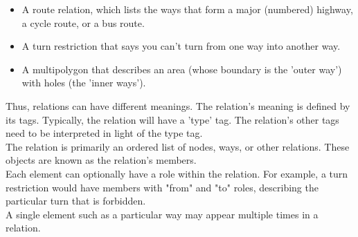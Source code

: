 \begin{itemize}
	\item A route relation, which lists the ways that form a major (numbered) highway, a cycle route, or a bus route.
	\item A turn restriction that says you can't turn from one way into another way.
	\item A multipolygon that describes an area (whose boundary is the 'outer way') with holes (the 'inner ways').
\end{itemize}
Thus, relations can have different meanings. The relation's meaning is defined by its tags. Typically, the relation will have a 'type' tag. The relation's other tags need to be interpreted in light of the type tag.\\
The relation is primarily an ordered list of nodes, ways, or other relations. These objects are known as the relation's members.\\
Each element can optionally have a role within the relation. For example, a turn restriction would have members with "from" and "to" roles, describing the particular turn that is forbidden.\\
A single element such as a particular way may appear multiple times in a relation. \cite{OSMElements}

